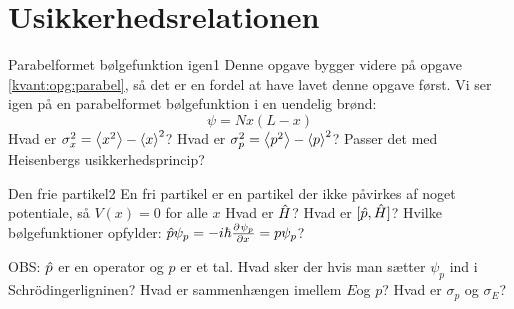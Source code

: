 \section*{Usikkerhedsrelationen}
\begin{opgave}{Parabelformet bølgefunktion igen}{1}
Denne opgave bygger videre på opgave \ref{kvant:opg:parabel}, så det er en fordel at have lavet denne opgave først. Vi ser igen på en parabelformet bølgefunktion i en uendelig brønd:
$$
\psi=Nx(L-x)
$$
\opg Hvad er $\sigma_x^2 = \expect{x^2}-\expect{x}^2$?
\opg Hvad er $\sigma_p^2 = \expect{p^2}-\expect{p}^2$?
\opg Passer det med Heisenbergs usikkerhedsprincip?
\end{opgave}
%
\begin{opgave}{Den frie partikel}{2}
En fri partikel er en partikel der ikke påvirkes af noget potentiale, så $V(x)=0$ for alle $x$
\opg Hvad er $\op H$?
\opg Hvad er $[\op p,\op H]$?
\opg Hvilke bølgefunktioner opfylder: $\op p \psi_p = -i\hbar\pdif{x}{\psi_p} = p\psi_p$?

OBS: $\op p$ er en operator og $p$ er et tal.
\opg Hvad sker der hvis man sætter $\psi_p$ ind i Schrödingerligninen?
\opg Hvad er sammenhængen imellem $E$og $p$?
\opg Hvad er $\sigma_p$ og $\sigma_E$?
\end{opgave}